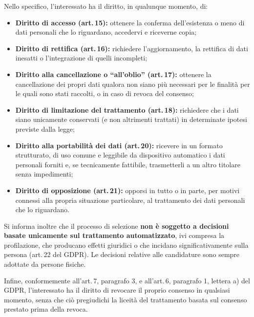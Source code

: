 \documentclass[legal]{polinetwork}
\begin{document}
Nello specifico, l'interessato ha il diritto, in qualunque momento, di:

\begin{itemize}
  \item \textbf{Diritto di accesso (art.\,15):} ottenere la conferma
    dell'esistenza o meno di dati personali che lo riguardano, accedervi
    e riceverne copia;
  \item \textbf{Diritto di rettifica (art.\,16):} richiedere
    l'aggiornamento, la rettifica di dati inesatti o l'integrazione di
    quelli incompleti;
  \item \textbf{Diritto alla cancellazione o ``all'oblio'' (art.\,17):}
    ottenere la cancellazione dei propri dati qualora non siano più
    necessari per le finalità per le quali sono stati raccolti, o in caso
    di revoca del consenso;
  \item \textbf{Diritto di limitazione del trattamento (art.\,18):}
    richiedere che i dati siano unicamente conservati (e non altrimenti
    trattati) in determinate ipotesi previste dalla legge;
  \item \textbf{Diritto alla portabilità dei dati (art.\,20):} ricevere
    in un formato strutturato, di uso comune e leggibile da dispositivo
    automatico i dati personali forniti e, se tecnicamente fattibile,
    trasmetterli a un altro titolare senza impedimenti;
  \item \textbf{Diritto di opposizione (art.\,21):} opporsi in tutto o
    in parte, per motivi connessi alla propria situazione particolare,
    al trattamento dei dati personali che lo riguardano.
\end{itemize}

Si informa inoltre che il processo di selezione \textbf{non è soggetto a
decisioni basate unicamente sul trattamento automatizzato}, ivi compresa
la profilazione, che producano effetti giuridici o che incidano
significativamente sulla persona (art.\,22 del GDPR). Le decisioni
relative alle candidature sono sempre adottate da persone fisiche.


Infine, conformemente all'art.\,7, paragrafo 3, e all'art.\,6, paragrafo
1, lettera a) del GDPR, l'interessato ha il diritto di revocare il proprio
consenso in qualsiasi momento, senza che ciò pregiudichi la liceità del
trattamento basata sul consenso prestato prima della revoca.


\vfill
\pnContactBlock
\end{document}
